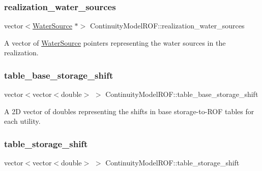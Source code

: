 \subsubsection{\texorpdfstring{realization\+\_\+water\+\_\+sources}{realization\_water\_sources}}
{\footnotesize\ttfamily vector$<$\mbox{\hyperlink{classWaterSource}{Water\+Source}} $\ast$$>$ Continuity\+Model\+R\+O\+F\+::realization\+\_\+water\+\_\+sources\hspace{0.3cm}{\ttfamily [protected]}}



A vector of {\ttfamily \mbox{\hyperlink{classWaterSource}{Water\+Source}}} pointers representing the water sources in the realization. 

\mbox{\label{classContinuityModelROF_a2bc5728653819a0d54a36ffbb1df44a3}} 
\subsubsection{\texorpdfstring{table\+\_\+base\+\_\+storage\+\_\+shift}{table\_base\_storage\_shift}}
{\footnotesize\ttfamily vector$<$vector$<$double$>$ $>$ Continuity\+Model\+R\+O\+F\+::table\+\_\+base\+\_\+storage\+\_\+shift\hspace{0.3cm}{\ttfamily [protected]}}



A 2D vector of doubles representing the shifts in base storage-\/to-\/\+R\+OF tables for each utility. 

\mbox{\label{classContinuityModelROF_a1a90c8816944aab36f395e89f7b84c06}} 
\subsubsection{\texorpdfstring{table\+\_\+storage\+\_\+shift}{table\_storage\_shift}}
{\footnotesize\ttfamily vector$<$vector$<$double$>$ $>$ Continuity\+Model\+R\+O\+F\+::table\+\_\+storage\+\_\+shift\hspace{0.3cm}{\ttfamily [protected]}}



